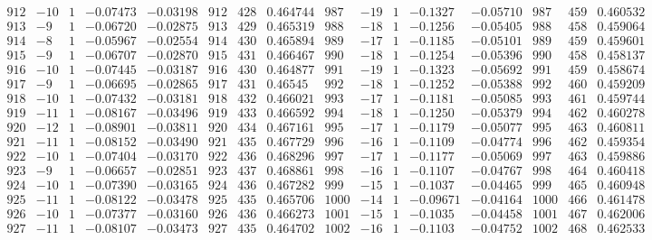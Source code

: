 \documentclass[11pt,reqno,a4letter]{article}
\numberwithin{figure}{section}
\numberwithin{table}{section}
\theoremstyle{plain}
\numberwithin{theorem}{section}
\theoremstyle{definition}
\begin{document}
\begin{table}[ht]
\begin{equation*}
{\begin{array}{ccccc|ccc|ccccc|ccc}
 912 & -10 & 1 & -0.07473 & -0.03198 & 912 & 428 & 0.464744 & 987 & -19 & 1 & -0.1327 & -0.05710 & 987 & 459 & 0.460532 \\
 913 & -9 & 1 & -0.06720 & -0.02875 & 913 & 429 & 0.465319 & 988 & -18 & 1 & -0.1256 & -0.05405 & 988 & 458 & 0.459064 \\
 914 & -8 & 1 & -0.05967 & -0.02554 & 914 & 430 & 0.465894 & 989 & -17 & 1 & -0.1185 & -0.05101 & 989 & 459 & 0.459601 \\
 915 & -9 & 1 & -0.06707 & -0.02870 & 915 & 431 & 0.466467 & 990 & -18 & 1 & -0.1254 & -0.05396 & 990 & 458 & 0.458137 \\
 916 & -10 & 1 & -0.07445 & -0.03187 & 916 & 430 & 0.464877 & 991 & -19 & 1 & -0.1323 & -0.05692 & 991 & 459 & 0.458674 \\
 917 & -9 & 1 & -0.06695 & -0.02865 & 917 & 431 & 0.46545 & 992 & -18 & 1 & -0.1252 & -0.05388 & 992 & 460 & 0.459209 \\
 918 & -10 & 1 & -0.07432 & -0.03181 & 918 & 432 & 0.466021 & 993 & -17 & 1 & -0.1181 & -0.05085 & 993 & 461 & 0.459744 \\
 919 & -11 & 1 & -0.08167 & -0.03496 & 919 & 433 & 0.466592 & 994 & -18 & 1 & -0.1250 & -0.05379 & 994 & 462 & 0.460278 \\
 920 & -12 & 1 & -0.08901 & -0.03811 & 920 & 434 & 0.467161 & 995 & -17 & 1 & -0.1179 & -0.05077 & 995 & 463 & 0.460811 \\
 921 & -11 & 1 & -0.08152 & -0.03490 & 921 & 435 & 0.467729 & 996 & -16 & 1 & -0.1109 & -0.04774 & 996 & 462 & 0.459354 \\
 922 & -10 & 1 & -0.07404 & -0.03170 & 922 & 436 & 0.468296 & 997 & -17 & 1 & -0.1177 & -0.05069 & 997 & 463 & 0.459886 \\
 923 & -9 & 1 & -0.06657 & -0.02851 & 923 & 437 & 0.468861 & 998 & -16 & 1 & -0.1107 & -0.04767 & 998 & 464 & 0.460418 \\
 924 & -10 & 1 & -0.07390 & -0.03165 & 924 & 436 & 0.467282 & 999 & -15 & 1 & -0.1037 & -0.04465 & 999 & 465 & 0.460948 \\
 925 & -11 & 1 & -0.08122 & -0.03478 & 925 & 435 & 0.465706 & 1000 & -14 & 1 & -0.09671 & -0.04164 & 1000 & 466 & 0.461478 \\
 926 & -10 & 1 & -0.07377 & -0.03160 & 926 & 436 & 0.466273 & 1001 & -15 & 1 & -0.1035 & -0.04458 & 1001 & 467 & 0.462006 \\
 927 & -11 & 1 & -0.08107 & -0.03473 & 927 & 435 & 0.464702 & 1002 & -16 & 1 & -0.1103 & -0.04752 & 1002 & 468 & 0.462533 \\

\end{array}}
\end{equation*}
\end{table}
\end{document}
